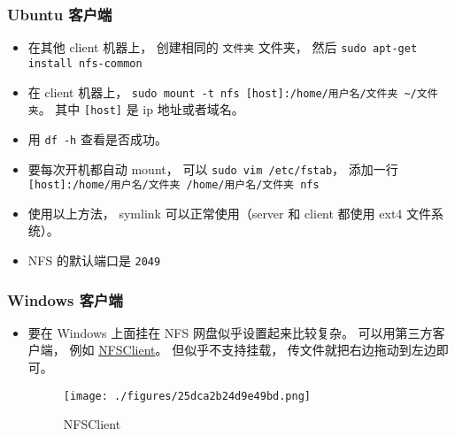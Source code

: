 \subsubsection{Ubuntu 客户端}
\begin{itemize}
\item 在其他 client 机器上， 创建相同的 \verb|文件夹| 文件夹， 然后 \verb|sudo apt-get install nfs-common|
\item 在 client 机器上， \verb|sudo mount -t nfs [host]:/home/用户名/文件夹 ~/文件夹|。 其中 \verb|[host]| 是 ip 地址或者域名。
\item 用 \verb|df -h| 查看是否成功。
\item 要每次开机都自动 mount， 可以 \verb|sudo vim /etc/fstab|， 添加一行 \verb|[host]:/home/用户名/文件夹 /home/用户名/文件夹 nfs|
\item 使用以上方法， symlink 可以正常使用（server 和 client 都使用 ext4 文件系统）。
\item NFS 的默认端口是 \verb|2049|
\end{itemize}

\subsubsection{Windows 客户端}
\begin{itemize}
\item 要在 Windows 上面挂在 NFS 网盘似乎设置起来比较复杂。 可以用第三方客户端， 例如 \href{https://sourceforge.net/projects/nfsclient/}{NFSClient}。 但似乎不支持挂载， 传文件就把右边拖动到左边即可。
\begin{figure}[ht]
\centering
\texttt{[image: ./figures/25dca2b24d9e49bd.png]}
\caption{NFSClient} \label{fig_NFS_1}
\end{figure}
\end{itemize}

